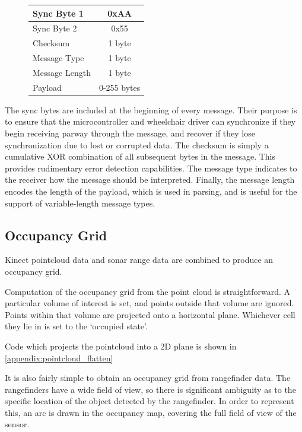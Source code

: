 \documentclass[oneside,final,a4paper]{report}
\begin{document}
\begin{figure}[hbt]
 \centering
 \begin{tabular}{|l|c|}
  \hline
   Sync Byte 1 & 0xAA \\ \hline
   Sync Byte 2 & 0x55 \\ \hline
   Checksum & 1 byte \\ \hline
   Message Type & 1 byte \\ \hline
   Message Length & 1 byte \\ \hline
   Payload & 0-255 bytes \\ \hline
 \end{tabular}
\end{figure}

The sync bytes are included at the beginning of every message.  Their purpose is to ensure that the microcontroller and wheelchair driver can synchronize if they begin receiving parway through the message, and recover if they lose synchronization due to lost or corrupted data.  The checksum is simply a cumulative XOR combination of all subsequent bytes in the message.  This provides rudimentary error detection capabilities.  The message type indicates to the receiver how the message should be interpreted.  Finally, the message length encodes the length of the payload, which is used in parsing, and is useful for the support of variable-length message types.

\subsection{Occupancy Grid}
Kinect pointcloud data and sonar range data are combined to produce an occupancy grid.  

Computation of the occupancy grid from the point cloud is straightforward.  A particular volume of interest is set, and points outside that volume are ignored.  Points within that volume are projected onto a horizontal plane.  Whichever cell they lie in is set to the `occupied state'.

Code which projects the pointcloud into a 2D plane is shown in \ref{appendix:pointcloud_flatten}

It is also fairly simple to obtain an occupancy grid from rangefinder data.  The rangefinders have a wide field of view, so there is significant ambiguity as to the specific location of the object detected by the rangefinder.  In order to represent this, an arc is drawn in the occupancy map, covering the full field of view of the sensor.
\end{document}
